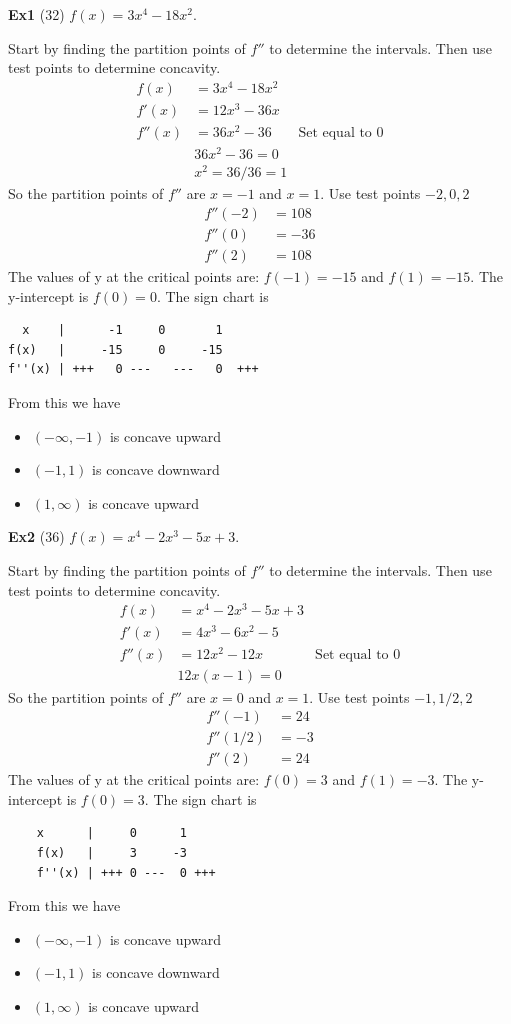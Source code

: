 \documentclass[14pt]{extarticle}
\begin{document}
\textbf{Ex1} (32)  $f(x) = 3x^4 -18x^2$.

Start by finding the partition points of $f''$ to determine the intervals. Then use test points to determine concavity.
\begin{align*}
	f(x) &= 3x^4 -18x^2 \\
	f'(x) &=12x^3-36x \\
	f''(x) &= 36x^2-36 &\text{Set equal to 0}\\
	&36x^2-36 = 0 \\
	&x^2 = 36/36 = 1
\end{align*}
So the partition points of $f''$ are $x=-1$ and $x=1$. Use test points $-2, 0, 2$
\begin{align*}
	f''(-2) &= 108 \\
	f''(0) &= -36 \\
	f''(2) &= 108
\end{align*}
The values of y at the critical points are: $f(-1) = -15$ and $f(1) = -15$. The y-intercept is $f(0)=0$. The sign chart is
\begin{verbatim}
  x    |      -1     0       1
f(x)   |     -15     0     -15  
f''(x) | +++   0 ---   ---   0  +++         
\end{verbatim}
From this we have
\begin{itemize}
	\item $(-\infty, -1)$ is concave upward
	\item $(-1,1)$ is concave downward
	\item $(1,\infty)$ is concave upward
\end{itemize}
\vspace{1em}


\textbf{Ex2} (36)  $f(x) = x^4 -2x^3-5x+3$.

Start by finding the partition points of $f''$ to determine the intervals. Then use test points to determine concavity.
\begin{align*}
	f(x) &= x^4 -2x^3-5x+3 \\
	f'(x) &= 4x^3-6x^2-5 \\
	f''(x) &= 12x^2 -12x &\text{Set equal to 0}\\
	&12x(x -1) = 0
\end{align*}
So the partition points of $f''$ are $x=0$ and $x=1$. Use test points $-1, 1/2, 2$
\begin{align*}
	f''(-1) &= 24 \\
	f''(1/2) &= -3\\
	f''(2) &= 24
\end{align*}
The values of y at the critical points are: $f(0) = 3$ and $f(1) = -3$. The y-intercept is $f(0)=3$. The sign chart is
\begin{verbatim}
	x      |     0      1      
	f(x)   |     3     -3
	f''(x) | +++ 0 ---  0 +++      
\end{verbatim}
From this we have
\begin{itemize}
	\item $(-\infty, -1)$ is concave upward
	\item $(-1,1)$ is concave downward
	\item $(1,\infty)$ is concave upward
\end{itemize}
\end{document}
